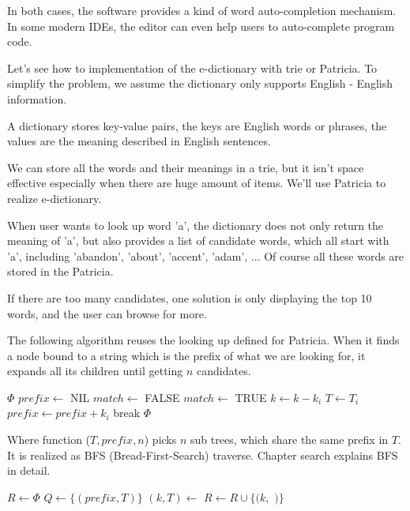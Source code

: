 \documentclass[UTF8]{article}
\begin{document}
In both cases, the software provides a kind of word auto-completion mechanism.
In some modern IDEs, the editor can even help users to auto-complete program code.

Let's see how to implementation of the e-dictionary with trie or Patricia.
To simplify the problem, we assume the dictionary only supports English - English
information.

A dictionary stores key-value pairs, the keys are English
words or phrases, the values are the meaning described in English sentences.

We can store all the words and their meanings in a trie, but it isn't
space effective especially when there are huge amount of items. We'll use
Patricia to realize e-dictionary.

When user wants to look up word 'a', the dictionary does not only
return the meaning of 'a', but also provides a list of
candidate words, which all start with 'a', including 'abandon', 'about',
'accent', 'adam', ... Of course all these words are stored in the Patricia.

If there are too many candidates, one solution is only displaying the top 10
words, and the user can browse for more.

The following algorithm reuses the looking up defined for Patricia. When it
finds a node bound to a string which is the prefix of what we are looking for,
it expands all its children until getting $n$ candidates.

\begin{algorithmic}[1]
     \State \Return $\Phi$
  \EndIf
  \State $prefix \gets$ NIL
  \Repeat
    \State $match \gets$ FALSE
        \State \Return {}
      \EndIf
        \State $match \gets$ TRUE
        \State $k \gets k - k_i$
        \State $T \gets T_i$
        \State $prefix \gets prefix + k_i$
        \State break
      \EndIf
    \EndFor
  \State \Return $\Phi$
\EndFunction
\end{algorithmic}

Where function ($T, prefix, n$) picks $n$ sub trees, which
share the same prefix in $T$. It is realized as BFS (Bread-First-Search) traverse. Chapter search
explains BFS in detail.

\begin{algorithmic}[1]
  \State $R \gets \Phi$
  \State $Q \gets \{(prefix, T)\}$
    \State $(k, T) \gets$ 
      \State $R \gets R \cup \{(k, $  $)\}$
    \EndIf
      \State {}
    \EndFor
  \EndWhile
\EndFunction
\end{algorithmic}
\end{document}
